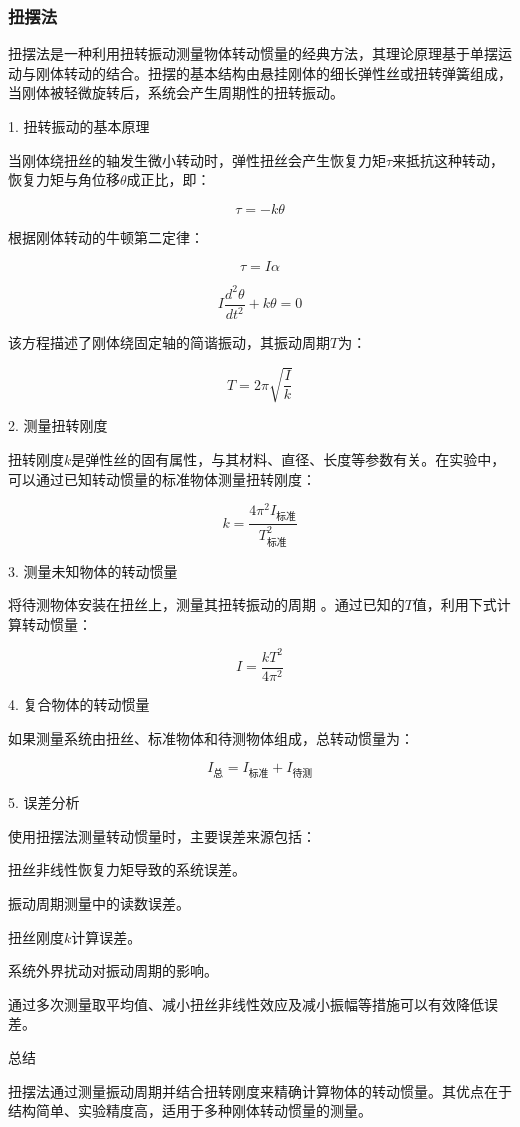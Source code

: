 \documentclass[12pt,hyperref,a4paper,UTF8]{ctexart}
\begin{document}
\subsubsection{扭摆法}

扭摆法是一种利用扭转振动测量物体转动惯量的经典方法，其理论原理基于单摆运动与刚体转动的结合。扭摆的基本结构由悬挂刚体的细长弹性丝或扭转弹簧组成，当刚体被轻微旋转后，系统会产生周期性的扭转振动。

1. 扭转振动的基本原理

当刚体绕扭丝的轴发生微小转动时，弹性扭丝会产生恢复力矩$\tau$来抵抗这种转动，恢复力矩与角位移$\theta$成正比，即：

$$ \tau = -k \theta $$

根据刚体转动的牛顿第二定律：

$$ \tau = I \alpha $$

$$ I \frac{d^2\theta}{dt^2} + k\theta = 0 $$

该方程描述了刚体绕固定轴的简谐振动，其振动周期$T$为：

$$T = 2\pi \sqrt{\frac{I}{k}}$$

2. 测量扭转刚度 

扭转刚度$k$是弹性丝的固有属性，与其材料、直径、长度等参数有关。在实验中，可以通过已知转动惯量的标准物体测量扭转刚度：

$$k = \frac{4\pi^2 I_{\text{标准}}}{T_{\text{标准}}^2}$$

3. 测量未知物体的转动惯量

将待测物体安装在扭丝上，测量其扭转振动的周期 。通过已知的$T$值，利用下式计算转动惯量：

$$I = \frac{k T^2}{4\pi^2}$$

4. 复合物体的转动惯量

如果测量系统由扭丝、标准物体和待测物体组成，总转动惯量为：

$$I_{\text{总}} = I_{\text{标准}} + I_{\text{待测}}$$

5. 误差分析

使用扭摆法测量转动惯量时，主要误差来源包括：

扭丝非线性恢复力矩导致的系统误差。

振动周期测量中的读数误差。

扭丝刚度$k$计算误差。

系统外界扰动对振动周期的影响。


通过多次测量取平均值、减小扭丝非线性效应及减小振幅等措施可以有效降低误差。

总结

扭摆法通过测量振动周期并结合扭转刚度来精确计算物体的转动惯量。其优点在于结构简单、实验精度高，适用于多种刚体转动惯量的测量。
\end{document}

